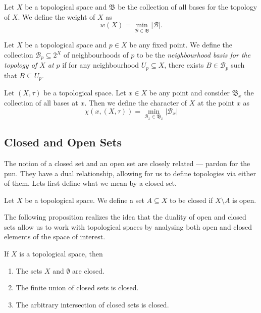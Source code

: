 \begin{definition}[Weight]\label{def: weight}
Let \(X\) be a topological space and \(\mathfrak B\) be the collection of
all bases for the topology of \(X\). We define the weight of \(X\) as
\[
  w(X) = \min_{\mathcal B \in \mathfrak B} |\mathcal B|.
\]
\end{definition}

\begin{definition}\label{def: basis at a point}
Let \(X\) be a topological space and \(p \in X\) be any fixed point. We define
the collection \(\mathcal B_p \subseteq 2^X\) of neighbourhoods of \(p\) to be
the \emph{neighbourhood basis for the topology of \(X\) at \(p\)} if for any
neighbourhood \(U_p \subseteq X\), there exists \(B \in \mathcal B_p\) such
that \(B \subseteq U_p\).
\end{definition}

\begin{definition}\label{def: character}
Let \((X, \tau)\) be a topological space. Let \(x \in X\) be any point
and consider \(\mathfrak B_x\) the collection of all bases at \(x\). Then we
define the character of \(X\) at the point \(x\) as
\[
  \chi(x, (X, \tau))
  = \min_{\mathcal B_x \in \mathfrak B_x} |\mathcal B_x|
\]
\end{definition}


\subsection{Closed and Open Sets}

The notion of a closed set and an open set are closely related --- pardon for
the pun. They have a dual relationship, allowing for us to define topologies via
either of them. Lets first define what we mean by a closed set.

\begin{definition}\label{def:closed-set}
Let \(X\) be a topological space. We define a set \(A \subseteq X\) to be
closed if \(X \setminus A\) is open.
\end{definition}

The following proposition realizes the idea that the duality of open and closed
sets allow us to work with topological spaces by analysing both open and closed
elements of the space of interest.

\begin{proposition}\label{prop:equiv-closed-topology}
If \(X\) is a topological space, then
\begin{enumerate}\setlength\itemsep{0em}
\item The sets \(X\) and \(\emptyset\) are closed.

\item The finite union of closed sets is closed.

\item The arbitrary intersection of closed sets is closed.
\end{enumerate}
\end{proposition}

